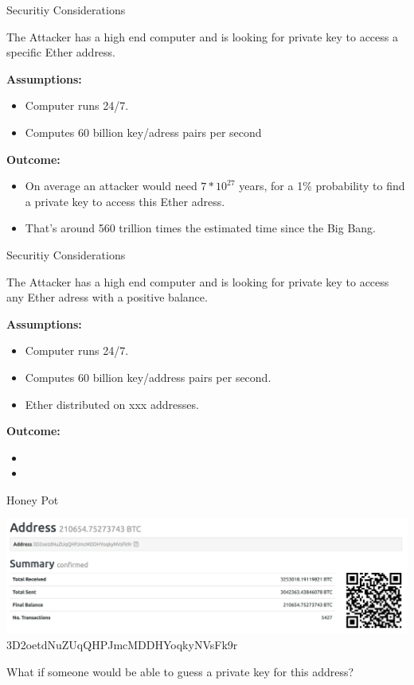 \documentclass[handout]{beamer}
\begin{document}
\begin{frame}{Securitiy Considerations}

The Attacker has a high end computer and is looking for private key to access a specific Ether address.

\vspace{1em}

\textbf{Assumptions:}
\begin{itemize}
\item<1-> Computer runs 24/7.
\item<2-> Computes 60 billion key/adress pairs per second
\end{itemize}

\vspace{1em}

\textbf{Outcome:}
\begin{itemize}
\item<1-> On average an attacker would need $7*10^{27}$ years, for a 1\% probability to find a private key to access this Ether adress. 
\item<2-> That's around 560 trillion times the estimated time since the Big Bang.
\end{itemize}

\end{frame}

\begin{frame}{Securitiy Considerations}

The Attacker has a high end computer and is looking for private key to access any Ether adress with a positive balance.

\vspace{1em}

\textbf{Assumptions:}
\begin{itemize}
\item<1-> Computer runs 24/7. 
\item<2-> Computes 60 billion key/address pairs per second.
\item<3-> Ether distributed on xxx addresses.
\end{itemize}

\vspace{1em}

\textbf{Outcome:}
\begin{itemize}
\item<1-> 
\item<2-> 
\end{itemize}

\end{frame}

\begin{frame}{Honey Pot}

\begin{center}
\includegraphics[width = 10 cm, frame]{../assets/images/honeypot}
3D2oetdNuZUqQHPJmcMDDHYoqkyNVsFk9r \\
\end{center}
\vspace{1em}
What if someone would be able to guess a private  key for this address?

\end{frame}
\end{document}
